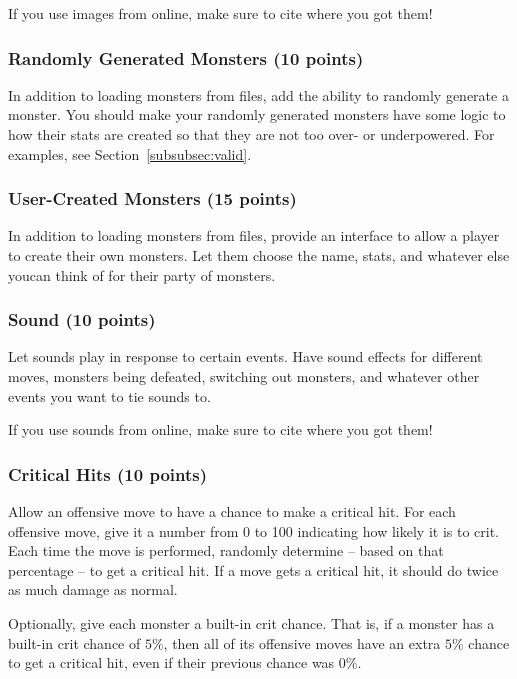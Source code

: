 \documentclass[11pt]{cselabheader}
\begin{document}
If you use images from online, make sure to cite where you got them!

\subsubsection{Randomly Generated Monsters (10 points)}
In addition to loading monsters from files, add the ability to randomly
generate a monster. You should make your randomly generated monsters have
some logic to how their stats are created so that they are not too over-
or underpowered. For examples, see Section~\ref{subsubsec:valid}.

\subsubsection{User-Created Monsters (15 points)}
In addition to loading monsters from files,
provide an interface to allow a player to create their own monsters. Let
them choose the name, stats, and whatever else youcan think of for their
party of monsters.

\subsubsection{Sound (10 points)}
Let sounds play in response to certain events. Have sound effects for
different moves, monsters being defeated, switching out monsters, and
whatever other events you want to tie sounds to.

If you use sounds from online, make sure to cite where you got them!

\subsubsection{Critical Hits (10 points)}
Allow an offensive move to have a chance to make a critical hit. For
each offensive move, give it a number from 0 to 100 indicating how
likely it is to crit. Each time the move is performed, randomly
determine -- based on that percentage -- to get a critical hit. If a
move gets a critical hit, it should do twice as much damage as normal.

Optionally, give each monster a built-in crit chance. That is, if a monster
has a built-in crit chance of $5\%$, then all of its offensive moves have
an extra $5\%$ chance to get a critical hit, even if their previous chance
was 0\%.

\end{document}
